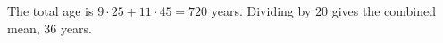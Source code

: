 The total age is $9\cdot25+11\cdot45=720$ years. Dividing by $20$ gives the combined mean, $\boxed{36}$ years.
